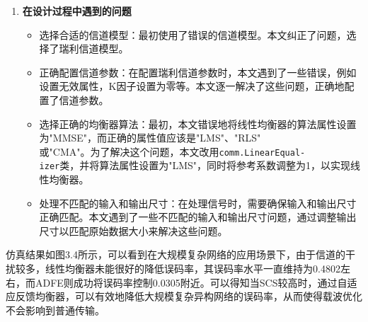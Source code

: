 \documentclass[UTF8,a4paper,12pt]{ctexart}
\numberwithin{equation}{section}
\begin{document}
\begin{enumerate}
		\item \textbf{在设计过程中遇到的问题}
		\begin{itemize}
			\item 选择合适的信道模型：最初使用了错误的信道模型。本文纠正了问题，选择了瑞利信道模型。
			\item 正确配置信道参数：在配置瑞利信道参数时，本文遇到了一些错误，例如设置无效属性，K因子设置为零等。本文逐一解决了这些问题，正确地配置了信道参数。
			\item 选择正确的均衡器算法：最初，本文错误地将线性均衡器的算法属性设置为"MMSE"，而正确的属性值应该是"LMS"、"RLS"\\或"CMA"。为了解决这个问题，本文改用\texttt{comm.LinearEqual-\\izer}类，并将算法属性设置为"LMS"，同时将参考系数调整为1，以实现线性均衡器。
			\item 处理不匹配的输入和输出尺寸：在处理信号时，需要确保输入和输出尺寸正确匹配。本文遇到了一些不匹配的输入和输出尺寸问题，通过调整输出尺寸以匹配原始数据大小来解决这些问题。
		\end{itemize}
	\end{enumerate}
	
	仿真结果如图3.4所示，可以看到在大规模复杂网络的应用场景下，由于信道的干扰较多，线性均衡器未能很好的降低误码率，其误码率水平一直维持为0.4802左右，而ADFE则成功将误码率控制0.0305附近。可以得知当SCS较高时，通过自适应反馈均衡器，可以有效地降低大规模复杂异构网络的误码率，从而使得载波优化不会影响到普通传输。
	\begin{figure}[H] 
	\end{figure}
	
\end{document}
